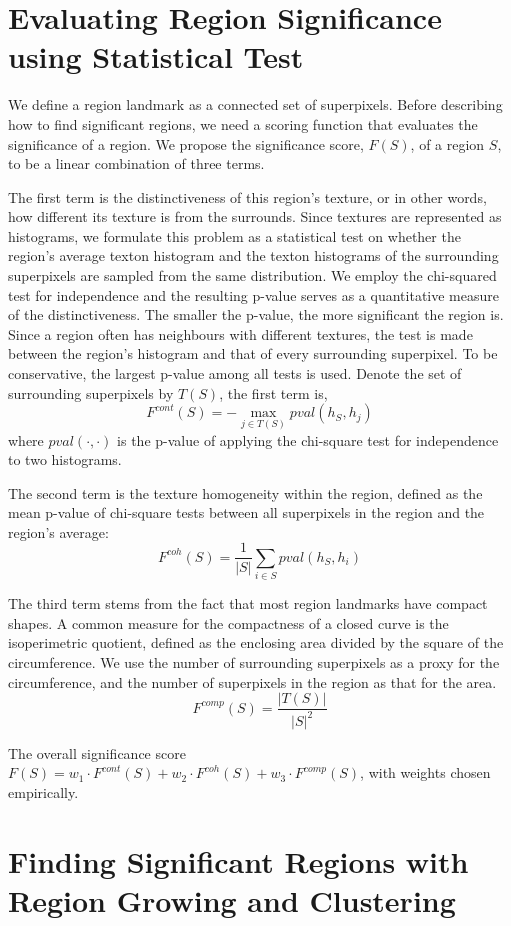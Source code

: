\documentclass{llncs}
\begin{document}
\section{Evaluating Region Significance using Statistical Test}

We define a region landmark as a connected set of superpixels. Before describing how to find significant regions, we need a scoring function that evaluates the significance of a region. We propose the significance score, $F(S)$, of a region $S$, to be a linear combination of three terms. 

The first term is the distinctiveness of this region's texture, or in other words, how different its texture is from the surrounds. Since textures are represented as histograms, we formulate this problem as a statistical test on whether the region's average texton histogram and the texton histograms of the surrounding superpixels are sampled from the same distribution. We employ the chi-squared test for independence and the resulting p-value serves as a quantitative measure of the distinctiveness. The smaller the p-value, the more significant the region is. Since a region often has neighbours with different textures, the test is made between the region's histogram and that of every surrounding superpixel. To be conservative, the largest p-value among all tests is used. Denote the set of surrounding superpixels by $T(S)$, the first term is,
$$F^{cont}(S) = - \max_{j\in T(S)} pval(h_S, h_j)$$
where $pval(\cdot,\cdot)$ is the p-value of applying the chi-square test for independence to two histograms.

The second term is the texture homogeneity within the region, defined as the mean p-value of chi-square tests between all superpixels in the region and the region's average:
$$F^{coh}(S) = \frac{1}{|S|} \sum_{i\in S} pval(h_S, h_i)$$

The third term stems from the fact that most region landmarks have compact shapes. A common measure for the compactness of a closed curve is the isoperimetric quotient, defined as the enclosing area divided by the square of the circumference. We use the number of surrounding superpixels as a proxy for the circumference, and the number of superpixels in the region as that for the area. 
$$F^{comp}(S) = \frac{|T(S)|}{|S|^2}$$

The overall significance score $F(S) = w_1 \cdot F^{cont}(S) + w_2 \cdot F^{coh}(S) + w_3 \cdot F^{comp}(S)$, with weights chosen empirically.


\section{Finding Significant Regions with Region Growing and Clustering}
\end{document}
